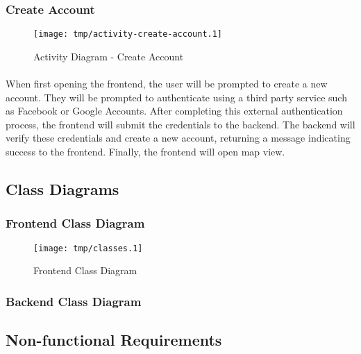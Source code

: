         \subsubsection{Create Account}
        \begin{figure}[H]
            \centering
            \texttt{[image: tmp/activity-create-account.1]} 
            \caption{Activity Diagram - Create Account}
        \end{figure}

        \paragraph*{}
        When first opening the frontend, the user will be prompted to create a new
        account. They will be prompted to authenticate using a third party service
        such as Facebook or Google Accounts. After completing this external
        authentication process, the frontend will submit the credentials to the
        backend. The backend will verify these credentials and create a new account,
        returning a message indicating success to the frontend. Finally, the frontend
        will open map view.


    \subsection{Class Diagrams}
        \subsubsection{Frontend Class Diagram}
            \begin{figure}[H]
                \centering
                \texttt{[image: tmp/classes.1]} 
                \caption{Frontend Class Diagram}
            \end{figure}

        \subsubsection{Backend Class Diagram}

    \subsection{Non-functional Requirements}

